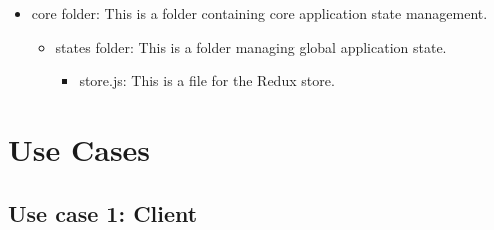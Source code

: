 \documentclass[conference]{IEEEtran}
\begin{document}
\begin{itemize}
\begin{itemize}
\begin{itemize}
\begin{itemize}
	      	      	      \end{itemize}
	      	      \end{itemize}
	      	\item core folder: This is a folder containing core application state management.
	      	      \begin{itemize}
	      	      	\item states folder: This is a folder managing global application state.
	      	      	      \begin{itemize}
	      	      	      	\item store.js: This is a file for the Redux store.
	      	      	      \end{itemize}
	      	      \end{itemize}
	      \end{itemize}
\end{itemize}

\section{Use Cases}
\subsection{Use case 1: Client}
\end{document}
